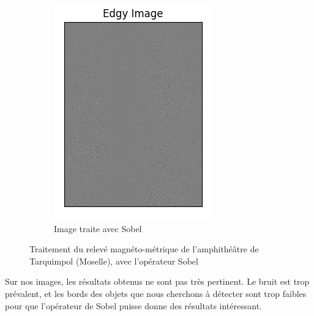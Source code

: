 \documentclass[a4paper, 12pt, titlepage, oneside, french]{article}
\begin{document}
\begin{figure}[H]
\begin{subfigure}[]{0.4\linewidth}
			\includegraphics[width=\linewidth]{Sobel1a.png}
			\caption{Image traite avec Sobel}

		\end{subfigure}
		\caption{Traitement du relevé magnéto-métrique de l'amphithéâtre de Tarquimpol (Moselle), avec l'opérateur Sobel}
		\label{fig:OurSobel}
	\end{figure}

	Sur nos images, les résultats obtenus ne sont pas très pertinent. Le bruit est trop prévalent, et les bords des objets que nous cherchons à détecter sont trop faibles pour que l'opérateur de Sobel puisse donne des résultats intéressant.
\end{document}
